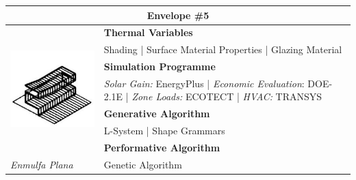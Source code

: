 \begin{table}
	\begin{tabular}{ | m{6cm} | m{14cm} |}
	\toprule
	\multicolumn{2}{c}{Envelope \#{}5} \\[1cm] \hline
	\multirow{7}{*}{\includegraphics[width=5.4cm]{./Images/14-Envelope5}} & \textbf{Thermal Variables} \\[1cm]
	& Shading | Surface Material Properties | Glazing Material\vspace{0.5cm}\\ \cline{2-2}
		 & \textbf{Simulation Programme} \\[1cm]
		 & \emph{Solar Gain:} EnergyPlus | \emph{Economic Evaluation}: DOE-2.1E | \emph{Zone Loads:} ECOTECT | \emph{HVAC:} TRANSYS \vspace{0.5cm}\\ \cline{2-2}
		 & \textbf{Generative Algorithm} \\[1cm]
		 & L-System | Shape Grammars\vspace{0.5cm}\\ \cline{2-2}
		 & \textbf{Performative Algorithm} \\[1cm]
		 \emph{Enmulfa Plana} &  Genetic Algorithm\vspace{0.5cm}\\
	\bottomrule
	\end{tabular}
\end{table}

\clearpage

